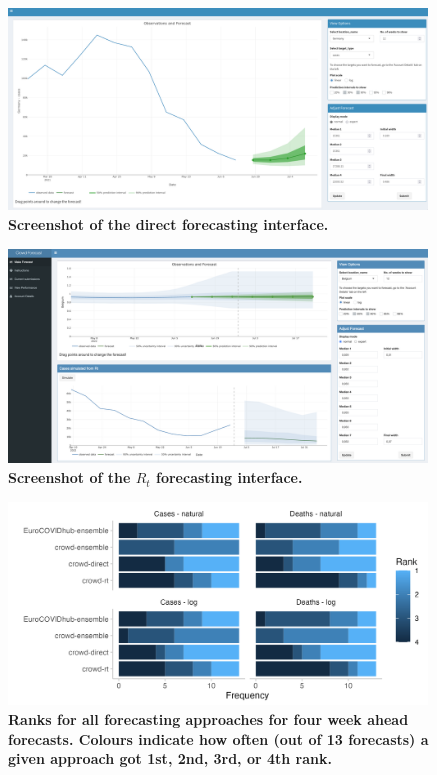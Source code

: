 \documentclass[10pt,a4paper,twocolumn]{article}
\begin{document}
\begin{figure}
\centering
\includegraphics[width=0.99\textwidth]{../output/figures/screenshot-crowd-classical.png}
\caption{\bf{Screenshot of the direct forecasting interface.}}
\label{fig:screenshot-classical}
\end{figure}


\begin{figure}
\centering
\includegraphics[width=0.99\textwidth]{../output/figures/screenshot-crowd-rt-app.png}
\caption{\bf{Screenshot of the $R_t$ forecasting interface.}}
\label{fig:screenshot-rt}
\end{figure}



\begin{figure}
\centering
\includegraphics[width=0.99\textwidth]{../output/figures/performance-ranks-4.png}
\caption{\bf{Ranks for all forecasting approaches for four week ahead forecasts}. Colours indicate how often (out of 13 forecasts) a given approach got 1st, 2nd, 3rd, or 4th rank.}
\label{fig:performance-ranks-4}
\end{figure}
\end{document}
